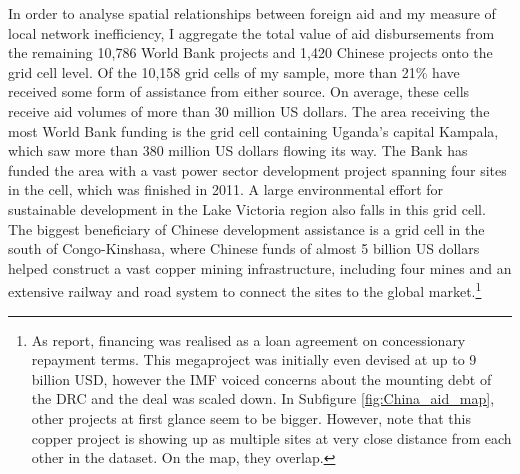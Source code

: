 \documentclass[11pt, oneside]{article}   	%
\begin{document}
In order to analyse spatial relationships between foreign aid and my measure of local network inefficiency, I aggregate the total value of aid disbursements from the remaining 10,786 World Bank projects and 1,420 Chinese projects onto the grid cell level. Of the 10,158 grid cells of my sample, more than 21\% have received some form of assistance from either source. On average, these cells receive aid volumes of more than 30 million US dollars. The area receiving the most World Bank funding is the grid cell containing Uganda's capital Kampala, which saw more than 380 million US dollars flowing its way. The Bank has funded the area with a vast power sector development project spanning four sites in the cell, which was finished in 2011. A large environmental effort for sustainable development in the Lake Victoria region also falls in this grid cell. The biggest beneficiary of Chinese development assistance is a grid cell in the south of Congo-Kinshasa, where Chinese funds of almost 5 billion US dollars helped construct a vast copper mining infrastructure, including four mines and an extensive railway and road system to connect the sites to the global market.\footnote{As \cite{Strange_TrackingUnderreportedFinancial_2017} report, financing was realised as a loan agreement on concessionary repayment terms. This megaproject was initially even devised at up to 9 billion USD, however the IMF voiced concerns about the mounting debt of the DRC and the deal was scaled down. In Subfigure \eqref{fig:China_aid_map}, other projects at first glance seem to be bigger. However, note that this copper project is showing up as multiple sites at very close distance from each other in the dataset. On the map, they overlap.}
\end{document}
